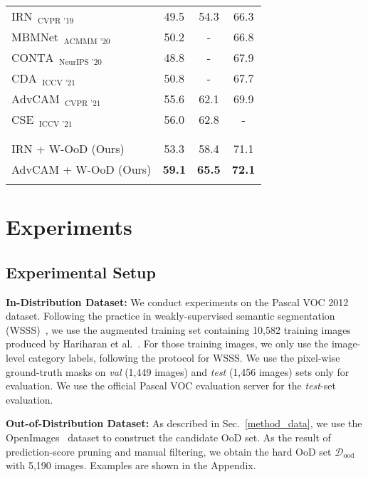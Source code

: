 \documentclass[10pt,twocolumn,letterpaper]{article}
\begin{document}
\begin{table}[tbp]
\begin{tabular}{l@{\hskip 0.3in}c@{\hskip 0.1in}c@{\hskip 0.08in}c}
$\text{IRN}_{\text{~~CVPR '19}}$~\cite{ahn2019weakly} & 49.5  & 54.3 & 66.3 \\
    $\text{MBMNet}_{\text{~~ACMMM '20}}$~\cite{liu2020weakly} & 50.2 & - & 66.8 \\
    $\text{CONTA}_{\text{~~NeurIPS '20}}$~\cite{zhang2020causal} & 48.8 & - & 67.9 \\
    $\text{CDA}_{\text{~~ICCV '21}}$~\cite{su2021context} & 50.8  & - & 67.7 \\
    $\text{AdvCAM}_{\text{~~CVPR '21}}$~\cite{lee2021anti} & 55.6  & 62.1 & 69.9 \\
    $\text{CSE}_{\text{~~ICCV '21}}$~\cite{kweon2021unlocking} & 56.0  & 62.8 & - \\


\\[-0.9em]
\hline
    \\[-0.9em]
    IRN + W-OoD (Ours)  & 53.3 & 58.4 & 71.1  \\
    AdvCAM + W-OoD (Ours)  & \textbf{59.1} & \textbf{65.5} &\textbf{72.1}  \\

    \Xhline{1pt}
    \vspace{-2em}
    \end{tabular}\label{table_seed}\end{table}%
\section{Experiments}
\subsection{Experimental Setup}\label{setup_sec}
\textbf{In-Distribution Dataset:} We conduct experiments on the Pascal VOC 2012~\cite{everingham2010pascal} dataset.
Following the practice in weakly-supervised semantic segmentation (WSSS)~\cite{lee2021anti, ahn2019weakly, wang2020self}, we use the augmented training set containing 10,582 training images produced by Hariharan et al.~\cite{hariharan2011semantic}.
For those training images, we only use the image-level category labels, following the protocol for WSSS.
We use the pixel-wise ground-truth masks on \textit{val} (1,449 images) and \textit{test} (1,456 images) sets only for evaluation.
We use the official Pascal VOC evaluation server for the \textit{test}-set evaluation.


\textbf{Out-of-Distribution Dataset:}
As described in Sec.~\ref{method_data}, we use the OpenImages~\cite{kuznetsova2020open} dataset to construct the candidate OoD set. As the result of prediction-score pruning and manual filtering, we obtain the hard OoD set $\mathcal{D}_\text{ood}$ with 5,190 images.
Examples are shown in the Appendix.
\end{document}
